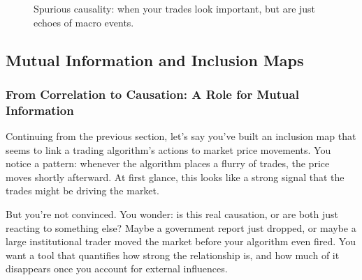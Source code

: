 \begin{figure}[H]
\centering
{}
\caption{Spurious causality: when your trades look important, but are just echoes of macro events.}
\end{figure}


\subsection{Mutual Information and Inclusion Maps}

\subsubsection{From Correlation to Causation: A Role for Mutual Information}

\vspace{0.5em}
\noindent
Continuing from the previous section, let’s say you've built an inclusion map that seems to link a trading algorithm’s actions to market price movements. You notice a pattern: whenever the algorithm places a flurry of trades, the price moves shortly afterward. At first glance, this looks like a strong signal that the trades might be driving the market.

But you're not convinced. You wonder: is this real causation, or are both just reacting to something else? Maybe a government report just dropped, or maybe a large institutional trader moved the market before your algorithm even fired. You want a tool that quantifies how strong the relationship is, and how much of it disappears once you account for external influences.

